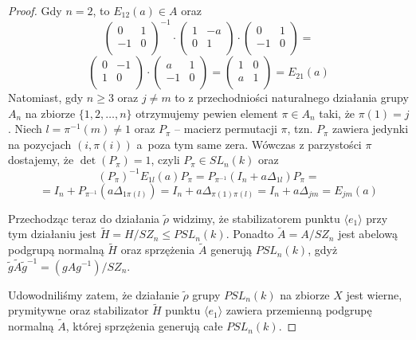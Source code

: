 \documentclass[licencjacka]{pracamgr}
\begin{document}
\begin{proof}
  Gdy $n = 2$, to $E_{1 2}(a) \in A$ oraz 
  $$ 
    \left( \begin{array}{cc} 0 & 1 \\ -1 & 0 \\ \end{array} \right)^{-1} \cdot
    \left( \begin{array}{cc} 1 & -a \\ 0 & 1 \\ \end{array} \right) \cdot
    \left( \begin{array}{cc} 0 & 1 \\ -1 & 0 \\ \end{array} \right) = 
  $$
  $$ 
    \left( \begin{array}{cc} 0 & -1 \\ 1 & 0 \\ \end{array} \right) \cdot
    \left( \begin{array}{cc} a & 1 \\ -1 & 0 \\ \end{array} \right) =
    \left( \begin{array}{cc} 1 & 0 \\ a & 1 \\ \end{array} \right) = E_{2 1}(a)
  $$
  Natomiast, gdy $n \ge 3$ oraz $j \ne m$ to z przechodniości naturalnego działania grupy $A_n$ na zbiorze $\{1, 2, \ldots, n \}$ 
  otrzymujemy pewien element $\pi \in A_n$ taki, że $\pi(1) = j$. Niech $l = \pi^{-1}(m) \ne 1$ oraz $P_\pi$ -- macierz permutacji $\pi$,
  tzn. $P_\pi$ zawiera jedynki na pozycjach $(i, \pi(i))$ a~poza tym same zera.
  Wówczas z parzystości $\pi$ dostajemy, że $\det(P_\pi) = 1$, czyli $P_\pi \in SL_n(k)$ oraz
  $$ (P_\pi)^{-1} E_{1 l}(a) P_\pi = P_{\pi^{-1}} (I_n + a \Delta_{1 l}) P_\pi = $$
  $$ = I_n + P_{\pi^{-1}} (a \Delta_{1 \pi(l)}) = I_n + a \Delta_{\pi(1) \pi(l)} = I_n + a \Delta_{j m} = E_{j m}(a) $$
  
  Przechodząc teraz do działania $\tilde{\rho}$ widzimy, że stabilizatorem punktu $\langle e_1 \rangle$ 
  przy tym działaniu jest $\tilde{H} = H/SZ_n \le PSL_n(k)$.
  Ponadto $\tilde{A} = A/SZ_n$ jest abelową podgrupą normalną $\tilde{H}$ oraz sprzężenia $\tilde{A}$ generują $PSL_n(k)$,
  gdyż $\tilde{g} \tilde{A} \tilde{g}^{-1} = (g A g^{-1}) / SZ_n$.

  Udowodniliśmy zatem, że działanie $\tilde{\rho}$ grupy $PSL_n(k)$ na zbiorze $X$ jest wierne, prymitywne 
  oraz stabilizator $\tilde{H}$ punktu $\langle e_1 \rangle$ zawiera przemienną podgrupę normalną $\tilde{A}$, 
  której sprzężenia generują całe $PSL_n(k)$.


\end{proof}
\end{document}
